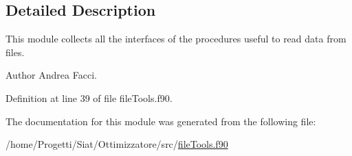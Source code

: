 \subsection{Detailed Description}
This module collects all the interfaces of the procedures useful to read data from files. \begin{DoxyAuthor}{Author}
Andrea Facci. 
\end{DoxyAuthor}


Definition at line 39 of file file\-Tools.\-f90.



The documentation for this module was generated from the following file\-:\begin{DoxyCompactItemize}
\item 
/home/\-Progetti/\-Siat/\-Ottimizzatore/src/\hyperlink{file_tools_8f90}{file\-Tools.\-f90}\end{DoxyCompactItemize}
